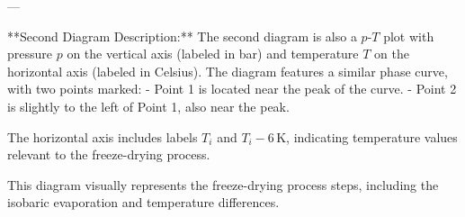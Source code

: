 ---

**Second Diagram Description:**  
The second diagram is also a \( p \)-\( T \) plot with pressure \( p \) on the vertical axis (labeled in bar) and temperature \( T \) on the horizontal axis (labeled in Celsius). The diagram features a similar phase curve, with two points marked:  
- Point 1 is located near the peak of the curve.  
- Point 2 is slightly to the left of Point 1, also near the peak.  

The horizontal axis includes labels \( T_i \) and \( T_i - 6 \, \text{K} \), indicating temperature values relevant to the freeze-drying process.  

This diagram visually represents the freeze-drying process steps, including the isobaric evaporation and temperature differences.
